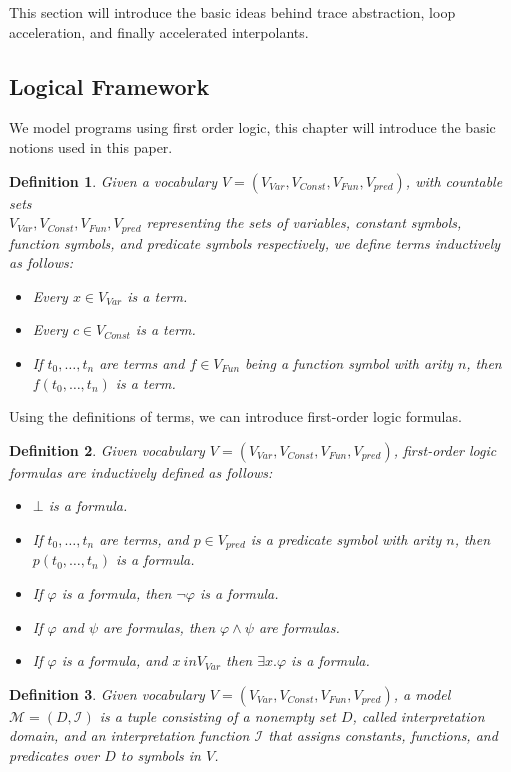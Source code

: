 \documentclass{article}
\newcommand{\Var}{\ensuremath{\mathit{Var}}\xspace}
\newcommand{\vocab}[1]{\ensuremath{V_{\mathit{#1}}}\xspace}
\newcommand{\interpret}{\ensuremath{\mathcal{I}}\xspace}
\newtheorem{mydef}{Definition}
\begin{document}
This section will introduce the basic ideas behind trace abstraction, loop acceleration, and finally accelerated interpolants.

\subsection{Logical Framework}
We model programs using first order logic, this chapter will introduce the basic notions used in this paper.
\begin{mydef}
	Given a vocabulary $V = (\vocab{Var}, \vocab{Const}, \vocab{Fun}, \vocab{pred})$, with countable sets \\ $\vocab{\Var}, \vocab{Const}, \vocab{Fun}, \vocab{pred}$ representing the sets of variables, constant symbols, function symbols, and predicate symbols respectively, we define terms inductively as follows:
	\begin{itemize}
		\item Every $x \in \vocab{Var}$ is a term.
		\item Every $c \in \vocab{Const}$ is a term.
		\item If $t_0, \ldots, t_n$ are terms and $f \in \vocab{Fun}$ being a function symbol with arity $n$, then $f(t_0, \ldots, t_n)$ is a term.
	\end{itemize}
\end{mydef}
Using the definitions of terms, we can introduce first-order logic formulas.

\begin{mydef}
	Given vocabulary $V = (\vocab{Var}, \vocab{Const}, \vocab{Fun}, \vocab{pred})$, first-order logic formulas are inductively defined as follows:
	\begin{itemize}
		\item $\bot$ is a formula.
		\item If  $t_0, \ldots, t_n$ are terms, and $p \in \vocab{pred}$ is a predicate symbol with arity $n$, then $p(t_0, \ldots, t_n)$ is a formula.
		\item If $\varphi$ is a formula, then $\neg \varphi$ is a formula.
		\item If $\varphi$ and $\psi$ are formulas, then $\varphi \land \psi$ are formulas.
		\item If $\varphi$ is a formula, and $x \ in \vocab{Var}$ then $\exists x. \varphi$ is a formula.
	\end{itemize}
\end{mydef}

\begin{mydef}
Given vocabulary $V = (\vocab{Var}, \vocab{Const}, \vocab{Fun}, \vocab{pred})$, a model $\mathcal{M} = (D, \interpret)$ is a tuple consisting of a nonempty set $D$, called interpretation domain, and an interpretation function \interpret that assigns constants, functions, and predicates over $D$ to symbols in $V$.
\end{mydef}
\end{document}
